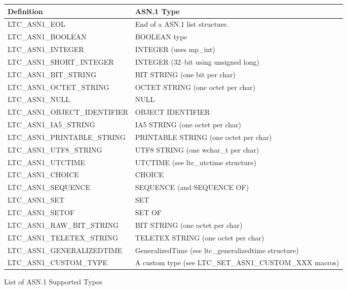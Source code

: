 \documentclass[synpaper]{book}
\begin{document}
\begin{figure}[h]
\begin{center}
\begin{small}
\begin{tabular}{|l|l|}
\hline \textbf{Definition}           & \textbf{ASN.1 Type} \\
\hline LTC\_ASN1\_EOL                & End of a ASN.1 list structure. \\
\hline LTC\_ASN1\_BOOLEAN            & BOOLEAN type \\
\hline LTC\_ASN1\_INTEGER            & INTEGER (uses mp\_int) \\
\hline LTC\_ASN1\_SHORT\_INTEGER     & INTEGER (32--bit using unsigned long) \\
\hline LTC\_ASN1\_BIT\_STRING        & BIT STRING (one bit per char) \\
\hline LTC\_ASN1\_OCTET\_STRING      & OCTET STRING (one octet per char) \\
\hline LTC\_ASN1\_NULL               & NULL \\
\hline LTC\_ASN1\_OBJECT\_IDENTIFIER & OBJECT IDENTIFIER  \\
\hline LTC\_ASN1\_IA5\_STRING        & IA5 STRING (one octet per char) \\
\hline LTC\_ASN1\_PRINTABLE\_STRING  & PRINTABLE STRING (one octet per char) \\
\hline LTC\_ASN1\_UTF8\_STRING       & UTF8 STRING (one wchar\_t per char) \\
\hline LTC\_ASN1\_UTCTIME            & UTCTIME (see ltc\_utctime structure) \\
\hline LTC\_ASN1\_CHOICE             & CHOICE \\
\hline LTC\_ASN1\_SEQUENCE           & SEQUENCE (and SEQUENCE OF) \\
\hline LTC\_ASN1\_SET                & SET \\
\hline LTC\_ASN1\_SETOF              & SET OF \\
\hline LTC\_ASN1\_RAW\_BIT\_STRING   & BIT STRING (one octet per char) \\
\hline LTC\_ASN1\_TELETEX\_STRING    & TELETEX STRING (one octet per char) \\
\hline LTC\_ASN1\_GENERALIZEDTIME    & GeneralizedTime (see ltc\_generalizedtime structure) \\
\hline LTC\_ASN1\_CUSTOM\_TYPE       & A custom type (see LTC\_SET\_ASN1\_CUSTOM\_XXX macros) \\
\hline
\end{tabular}
\caption{List of ASN.1 Supported Types}
\end{small}
\end{center}
\end{figure}
\end{document}
